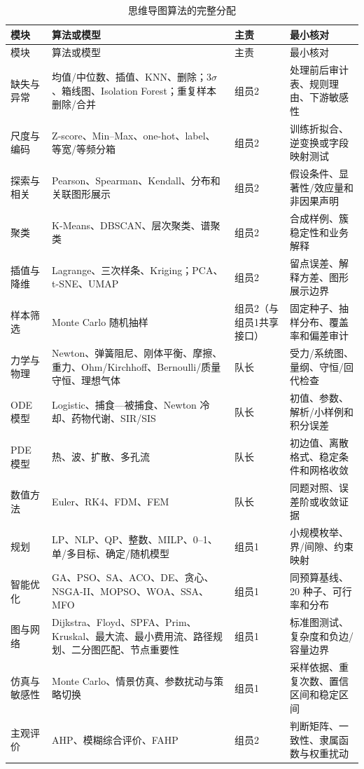 \documentclass[UTF8,a4paper,12pt]{ctexart}
\begin{document}
\begin{longtable}{p{2.1cm}p{5.0cm}p{2.0cm}p{5.5cm}}
\caption{思维导图算法的完整分配}\label{tab:algorithm-owner}\\
\toprule
模块 & 算法或模型 & 主责 & 最小核对\\
\midrule
\endfirsthead
\toprule
模块 & 算法或模型 & 主责 & 最小核对\\
\midrule
\endhead
缺失与异常 & 均值/中位数、插值、KNN、删除；$3\sigma$、箱线图、Isolation Forest；重复样本删除/合并 & 组员2 & 处理前后审计表、规则理由、下游敏感性\\
尺度与编码 & Z-score、Min--Max、one-hot、label、等宽/等频分箱 & 组员2 & 训练折拟合、逆变换或字段映射测试\\
探索与相关 & Pearson、Spearman、Kendall、分布和关联图形展示 & 组员2 & 假设条件、显著性/效应量和非因果声明\\
聚类 & K-Means、DBSCAN、层次聚类、谱聚类 & 组员2 & 合成样例、簇稳定性和业务解释\\
插值与降维 & Lagrange、三次样条、Kriging；PCA、t-SNE、UMAP & 组员2 & 留点误差、解释方差、图形展示边界\\
样本筛选 & Monte Carlo 随机抽样 & 组员2（与组员1共享接口） & 固定种子、抽样分布、覆盖率和偏差审计\\
力学与物理 & Newton、弹簧阻尼、刚体平衡、摩擦、重力、Ohm/Kirchhoff、Bernoulli/质量守恒、理想气体 & 队长 & 受力/系统图、量纲、守恒/回代检查\\
ODE 模型 & Logistic、捕食—被捕食、Newton 冷却、药物代谢、SIR/SIS & 队长 & 初值、参数、解析/小样例和积分误差\\
PDE 模型 & 热、波、扩散、多孔流 & 队长 & 初边值、离散格式、稳定条件和网格收敛\\
数值方法 & Euler、RK4、FDM、FEM & 队长 & 同题对照、误差阶或收敛证据\\
规划 & LP、NLP、QP、整数、MILP、0--1、单/多目标、确定/随机模型 & 组员1 & 小规模枚举、界/间隙、约束映射\\
智能优化 & GA、PSO、SA、ACO、DE、贪心、NSGA-II、MOPSO、WOA、SSA、MFO & 组员1 & 同预算基线、20 种子、可行率和分布\\
图与网络 & Dijkstra、Floyd、SPFA、Prim、Kruskal、最大流、最小费用流、路径规划、二分图匹配、节点重要性 & 组员1 & 标准图测试、复杂度和负边/容量边界\\
仿真与敏感性 & Monte Carlo、情景仿真、参数扰动与策略切换 & 组员1 & 采样依据、重复次数、置信区间和稳定区间\\
主观评价 & AHP、模糊综合评价、FAHP & 组员2 & 判断矩阵、一致性、隶属函数与权重扰动\\

\end{longtable}
\end{document}
